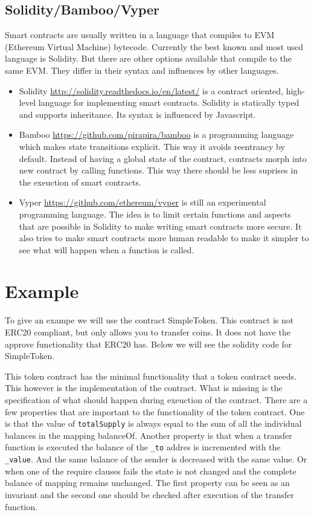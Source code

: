 \documentclass[a4paper]{article}
\begin{document}
\subsection{Solidity/Bamboo/Vyper}
Smart contracts are usually written in a language that compiles to EVM (Ethereum Virtual Machine) bytecode. Currently the best known and most used language is Solidity. But there are other options available that compile to the same EVM. They differ in their syntax and influences by other languages.  
\begin{itemize}
\item Solidity \url{http://solidity.readthedocs.io/en/latest/} is a contract oriented, high-level language for implementing smart contracts. Solidity is statically typed and supports inheritance. Its syntax is influenced by Javascript.
\item Bamboo \url{https://github.com/pirapira/bamboo} is a programming language which makes state transitions explicit. This way it avoids reentrancy by default. Instead of having a global state of the contract, contracts morph into new contract by calling functions. This way there should be less suprises in the exeuction of smart contracts.
\item Vyper \url{https://github.com/ethereum/vyper} is still an experimental programming language. The idea is to limit certain functions and aspects that are possible in Solidity to make writing smart contracts more secure. It also tries to make smart contracts more human readable to make it simpler to see what will happen when a function is called. 
\end{itemize}


\section{Example}
To give an exampe we will use the contract SimpleToken. This contract is not ERC20 compliant, but only allows you to transfer coins. It does not have the approve functionality that ERC20 has. Below we will see the solidity code for SimpleToken.



This token contract has the minimal functionality that a token contract needs. This however is the implementation of the contract. What is missing is the specification of what should happen during exeuction of the contract. There are a few properties that are important to the functionality of the token contract. One is that the value of \texttt{totalSupply} is always equal to the sum of all the individual balances in the mapping balanceOf. Another property is that when a transfer function is executed the balance of the \texttt{\_to} addres is incremented with the \texttt{\_value}. And the same balance of the sender is decreased with the same value. Or when one of the require clauses fails the state is not changed and the complete balance of mapping remains unchanged. The first property can be seen as an invariant and the second one should be checked after execution of the transfer function.
\end{document}
